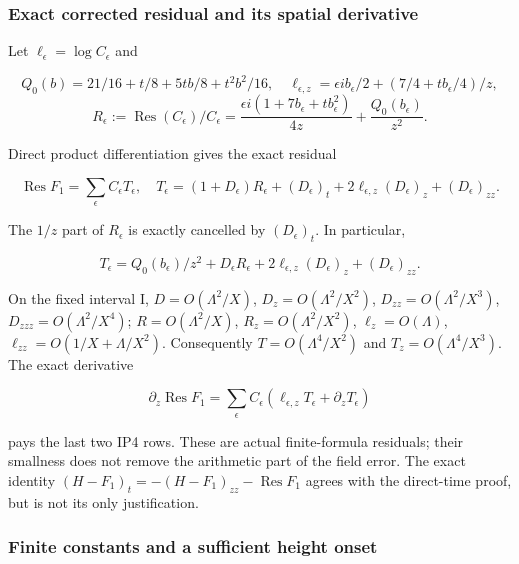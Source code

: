 \subsubsection{Exact corrected residual and its spatial derivative}
\label{subsec:ip-6}

Let \(\ell_{\epsilon}=\log C_{\epsilon}\) and

\[
Q_0(b)=21/16+t/8+5tb/8+t^2b^2/16,
\quad \ell_{\epsilon,z}=\epsilon i b_\epsilon/2
                     +(7/4+t b_\epsilon/4)/z,
\]
\[
R_\epsilon:=\operatorname{Res}(C_\epsilon)/C_\epsilon
 =\frac{\epsilon i(1+7b_\epsilon+t b_\epsilon^2)}{4z}
                         +\frac{Q_0(b_\epsilon)}{z^2}.
\tag{IP25}\label{eq:ansatz-ip25}
\]

Direct product differentiation gives the exact residual

\[
\operatorname{Res}F_1=\sum_\epsilon C_\epsilon T_\epsilon,
\quad T_\epsilon=(1+D_\epsilon)R_\epsilon+(D_\epsilon)_t
           +2\ell_{\epsilon,z}(D_\epsilon)_z+(D_\epsilon)_{zz}.
\tag{IP26}\label{eq:ansatz-ip26}
\]

The \(1/z\) part of \(R_{\epsilon}\) is exactly cancelled by \((D_{\epsilon})_{t}\). In particular,

\[
T_\epsilon=Q_0(b_\epsilon)/z^2+D_\epsilon R_\epsilon
       +2\ell_{\epsilon,z}(D_\epsilon)_z+(D_\epsilon)_{zz}.
\tag{IP27}\label{eq:ansatz-ip27}
\]

On the fixed interval I, \(D=O(\Lambda^{2}/X)\), \(D_{z}=O(\Lambda^{2}/X^{2})\), \(D_{zz}=O(\Lambda^{2}/X^{3})\), \(D_{zzz}=O(\Lambda^{2}/X^{4})\); \(R=O(\Lambda^{2}/X)\), \(R_{z}=O(\Lambda^{2}/X^{2})\), \(\ell_{z}=O(\Lambda)\), \(\ell_{zz}=O(1/X+\Lambda/X^{2})\). Consequently \(T=O(\Lambda^{4}/X^{2})\) and \(T_{z}=O(\Lambda^{4}/X^{3})\). The exact derivative

\[
\partial_z\operatorname{Res}F_1
 =\sum_\epsilon C_\epsilon(\ell_{\epsilon,z}T_\epsilon
                                      +\partial_zT_\epsilon)
\tag{IP28}\label{eq:ansatz-ip28}
\]

pays the last two IP4 rows. These are actual finite-formula residuals; their smallness does not remove the arithmetic part of the field error. The exact identity \((H-F_{1})_{t}=-(H-F_{1})_{zz}-\operatorname{Res} F_{1}\) agrees with the direct-time proof, but is not its only justification.

\subsubsection{Finite constants and a sufficient height onset}
\label{subsec:ip-7}

